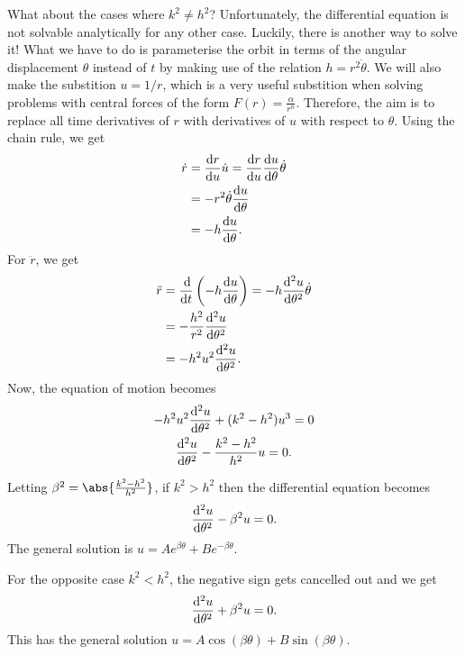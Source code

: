 \documentclass[../classical_mechanics.tex]{subfiles}
\begin{document}
\begin{example}
            What about the cases where $k^2\neq h^2$?
            Unfortunately, the differential equation is not solvable analytically for any other case.
            Luckily, there is another way to solve it!
            What we have to do is parameterise the orbit in terms of the angular displacement $\theta$ instead of $t$ by making use of the relation $h=r^2\dot{\theta}$.
            We will also make the substition $u=1/r$, which is a very useful substition when solving problems with central forces of the form $F(r)=\frac{\alpha}{r^n}$.
            Therefore, the aim is to replace all time derivatives of $r$ with derivatives of $u$ with respect to $\theta$.
            Using the chain rule, we get
            \begin{align}
                \dot{r}&=\dv{r}{u}\dot{u}=\dv{r}{u}\dv{u}{\theta}\dot{\theta}\\
                &=-r^2\dot{\theta}\dv{u}{\theta}\\
                &=-h\dv{u}{\theta}.
            \end{align}
            For $\ddot{r}$, we get
            \begin{align}
                \ddot{r}&=\dv{}{t}\left(-h\dv{u}{\theta}\right)=-h\dv[2]{u}{\theta}\dot{\theta}\\
                &=-\frac{h^2}{r^2}\dv[2]{u}{\theta}\\
                &=-h^2u^2\dv[2]{u}{\theta}.
            \end{align}
            Now, the equation of motion becomes
            \begin{gather}
                -h^2u^2\dv[2]{u}{\theta}+(k^2-h^2)u^3=0\\
                \dv[2]{u}{\theta}-\frac{k^2-h^2}{h^2}u=0.
            \end{gather}

            Letting $\beta^2=\abs{\frac{k^2-h^2}{h^2}}$, if $k^2>h^2$ then the differential equation becomes
            \begin{equation}
                \dv[2]{u}{\theta}-\beta^2 u=0.
            \end{equation}
            The general solution is $u=Ae^{\beta\theta}+Be^{-\beta\theta}$.

            For the opposite case $k^2<h^2$, the negative sign gets cancelled out and we get
            \begin{equation}
                \dv[2]{u}{\theta}+\beta^2 u=0.
            \end{equation}
            This has the general solution $u=A\cos(\beta\theta)+B\sin(\beta\theta)$.

        \end{example}
\end{document}
